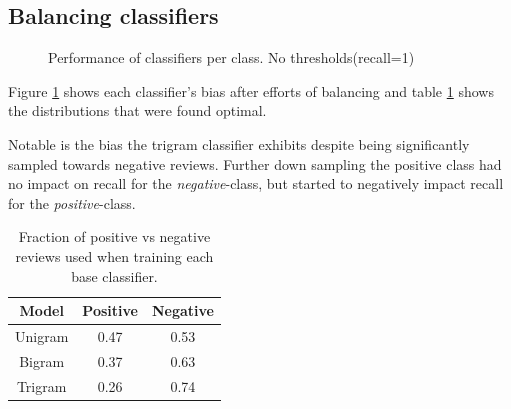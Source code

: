 \documentclass[a4paper,11pt]{kth-mag}
\begin{document}
\newpage

\subsection{Balancing classifiers}
\begin{figure}[h]
  \centering
  \caption{Performance of classifiers per class. No thresholds(recall=1)}
  \label{fig:sent_bias}
\end{figure}

Figure \ref{fig:sent_bias} shows each classifier's bias after efforts of balancing and table \ref{tab:sent_balances}
shows the distributions that were found optimal.

Notable is the bias the trigram classifier exhibits despite being significantly sampled towards negative reviews.
Further down sampling the positive class had no impact on recall for the \emph{negative}-class, but started to
negatively impact recall for the \emph{positive}-class.


\begin{table}[b]
  \centering
  \begin{tabular}{| c | c | c |}
    \hline
    \textbf{Model} & \textbf{Positive} & \textbf{Negative}\\ \hline
    Unigram&0.47& 0.53\\
    Bigram&0.37&0.63\\
    Trigram&0.26&0.74\\
    \hline
  \end{tabular}
  \caption{Fraction of positive vs negative reviews used when training each base classifier.}
  \label{tab:sent_balances}
\end{table}
\end{document}
